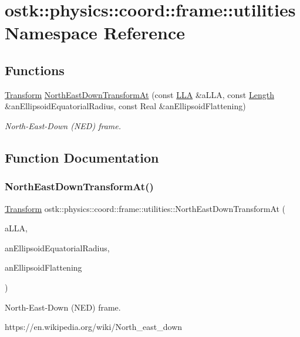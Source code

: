 \hypertarget{namespaceostk_1_1physics_1_1coord_1_1frame_1_1utilities}{}\section{ostk\+:\+:physics\+:\+:coord\+:\+:frame\+:\+:utilities Namespace Reference}
\label{namespaceostk_1_1physics_1_1coord_1_1frame_1_1utilities}
\subsection*{Functions}
\begin{DoxyCompactItemize}
\item 
\hyperlink{classostk_1_1physics_1_1coord_1_1_transform}{Transform} \hyperlink{namespaceostk_1_1physics_1_1coord_1_1frame_1_1utilities_a941185e500ff05b0aba62e6af3f38c1c}{North\+East\+Down\+Transform\+At} (const \hyperlink{classostk_1_1physics_1_1coord_1_1spherical_1_1_l_l_a}{L\+LA} \&a\+L\+LA, const \hyperlink{classostk_1_1physics_1_1units_1_1_length}{Length} \&an\+Ellipsoid\+Equatorial\+Radius, const Real \&an\+Ellipsoid\+Flattening)
\begin{DoxyCompactList}\small\item\em North-\/\+East-\/\+Down (N\+ED) frame. \end{DoxyCompactList}\end{DoxyCompactItemize}


\subsection{Function Documentation}
\mbox{\label{namespaceostk_1_1physics_1_1coord_1_1frame_1_1utilities_a941185e500ff05b0aba62e6af3f38c1c}} 
\subsubsection{\texorpdfstring{North\+East\+Down\+Transform\+At()}{NorthEastDownTransformAt()}}
{\footnotesize\ttfamily \hyperlink{classostk_1_1physics_1_1coord_1_1_transform}{Transform} ostk\+::physics\+::coord\+::frame\+::utilities\+::\+North\+East\+Down\+Transform\+At (\begin{DoxyParamCaption}\item[{const \hyperlink{classostk_1_1physics_1_1coord_1_1spherical_1_1_l_l_a}{L\+LA} \&}]{a\+L\+LA,  }\item[{const \hyperlink{classostk_1_1physics_1_1units_1_1_length}{Length} \&}]{an\+Ellipsoid\+Equatorial\+Radius,  }\item[{const Real \&}]{an\+Ellipsoid\+Flattening }\end{DoxyParamCaption})}



North-\/\+East-\/\+Down (N\+ED) frame. 

https\+://en.wikipedia.\+org/wiki/\+North\+\_\+east\+\_\+down 